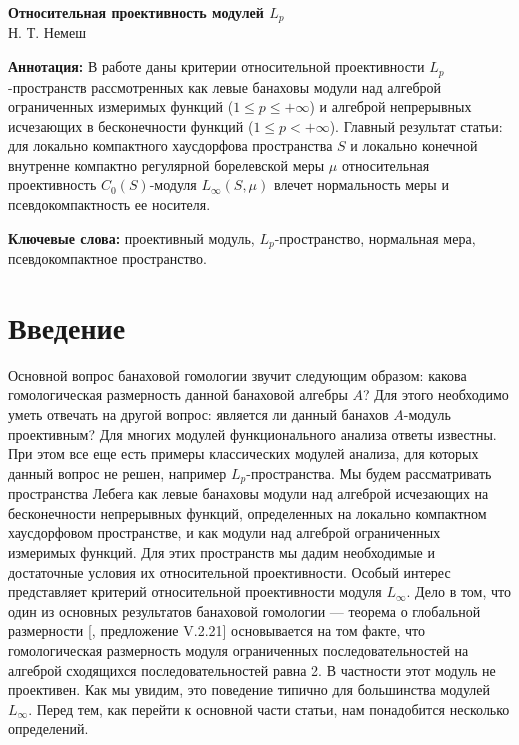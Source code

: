 \documentclass[12pt]{article}
\begin{document}
\begin{center}
    \Large \textbf{Относительная проективность модулей $L_p$}\\[0.5cm]
    \small {Н. Т. Немеш}
\end{center}

\thispagestyle{empty}

\medskip
\textbf{Аннотация:} В работе даны критерии относительной проективности
$L_p$-пространств рассмотренных как левые банаховы модули над алгеброй
ограниченных измеримых функций ($1\leq p\leq+\infty$) и алгеброй непрерывных
исчезающих в бесконечности функций ($1\leq p <+\infty$). Главный результат
статьи: для локально компактного хаусдорфова пространства $S$ и локально
конечной внутренне компактно регулярной борелевской меры $\mu$ относительная
проективность $C_0(S)$-модуля $L_\infty(S,\mu)$ влечет нормальность меры и 
псевдокомпактность ее носителя.

\medskip
\textbf{Ключевые слова:} проективный модуль, $L_p$-пространство, нормальная
мера, псевдокомпактное пространство.

\bigskip


\section{Введение}\label{SectionIntroduction}

Основной вопрос банаховой гомологии звучит следующим образом: какова
гомологическая размерность данной банаховой алгебры $A$? Для этого необходимо
уметь отвечать на другой вопрос: является ли данный банахов $A$-модуль
проективным? Для многих модулей функционального анализа ответы известны. При
этом все еще есть примеры классических модулей анализа, для которых данный
вопрос не решен, например $L_p$-пространства. Мы будем рассматривать
пространства Лебега как левые банаховы модули над алгеброй исчезающих на
бесконечности непрерывных функций, определенных на локально компактном
хаусдорфовом пространстве, и как модули над алгеброй ограниченных измеримых
функций. Для этих пространств мы дадим необходимые и достаточные условия их
относительной проективности. Особый интерес представляет критерий относительной
проективности модуля $L_\infty$. Дело в том, что один из основных результатов
банаховой гомологии --- теорема о глобальной размерности
[\cite{HelHomolBanTopAlg}, предложение V.2.21] основывается на том факте, что
гомологическая размерность модуля ограниченных последовательностей на алгеброй
сходящихся последовательностей равна 2. В частности этот модуль не проективен.
Как мы увидим, это поведение типично для большинства модулей $L_\infty$. Перед
тем, как перейти к основной части статьи, нам понадобится несколько определений.
\end{document}
